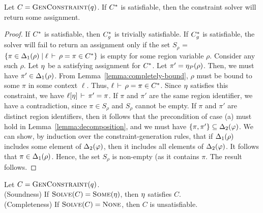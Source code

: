 \begin{theorem}
\label{thm:constraint-solver-completeness}
Let $C = \textsc{GenConstraint}(q)$.
If ${C}^*$ is satisfiable, then the constraint solver will return some assignment.
\end{theorem}

\begin{proof}
If ${C}^*$ is satisfiable, then ${C}^*_g$ is trivially satisfiable.
If ${C}^*_g$ is satisfiable, the solver will fail to return an assignment only if the set $S_\rho$ = 
$\{ \pi \in {\Delta_1}(\rho) \; | \; \ell\,\vdash\,\rho = \pi \in {C}^* \}$ is empty for some region variable $\rho$.
Consider any such $\rho$.
Let $\eta$ be a satisfying assignment for ${C}^*$.
Let $\pi' = \eta_P(\rho)$. Then, we must have $\pi' \in {\Delta_1}(\rho)$.
From Lemma~\ref{lemma:completely-bound}, $\rho$ must be bound to some $\pi$ in some context $\ell$.
Thus, $\ell\,\vdash\,\rho = \pi \in {C}^*$.
Since $\eta$ satisfies this constraint, we have $\ell[\eta]\,\vdash\,\pi' = \pi$.
If $\pi$ and $\pi'$ are the same region identifier, we have a contradiction, since
$\pi \in S_\rho$ and $S_\rho$ cannot be empty.
If $\pi$ and $\pi'$ are distinct region identifiers, then it follows that the precondition of case (a) must hold
in Lemma~\ref{lemma:decomposition}, and we must have $\{ \pi, \pi' \} \subseteq {\Delta_2}(\varphi)$.
We can show, by induction over the constraint-generation rules, that if ${\Delta_1}(\rho)$ includes
some element of ${\Delta_2}(\varphi)$, then it includes all elements of ${\Delta_2}(\varphi)$.
It follows that $\pi \in {\Delta_1}(\rho)$. Hence, the set $S_\rho$ is non-empty (as it contains $\pi$.
The result follows.
\end{proof}

\begin{theorem}
\label{thm:constraint-solver-sc}
Let $C = \textsc{GenConstraint}(q)$.\\
(Soundness) If $\textsc{Solve}(C) = \textsc{Some}(\eta)$, then $\eta$ satisfies $C$.\\
(Completeness) If $\textsc{Solve}(C) = \textsc{None}$, then $C$ is unsatisfiable.
\end{theorem}

